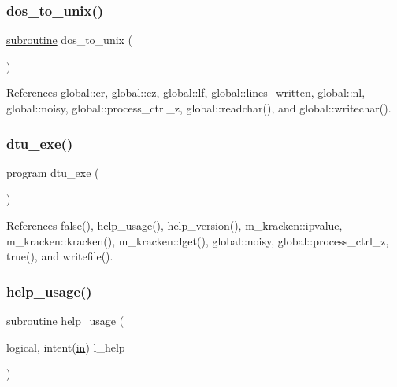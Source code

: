 \subsubsection{\texorpdfstring{dos\+\_\+to\+\_\+unix()}{dos\_to\_unix()}}
{\footnotesize\ttfamily \hyperlink{M__stopwatch_83_8txt_acfbcff50169d691ff02d4a123ed70482}{subroutine} dos\+\_\+to\+\_\+unix (\begin{DoxyParamCaption}{ }\end{DoxyParamCaption})}



References global\+::cr, global\+::cz, global\+::lf, global\+::lines\+\_\+written, global\+::nl, global\+::noisy, global\+::process\+\_\+ctrl\+\_\+z, global\+::readchar(), and global\+::writechar().

\mbox{\label{dtu_8f90_abff0f15f5d5e680978944e8d3530395a}} 
\subsubsection{\texorpdfstring{dtu\+\_\+exe()}{dtu\_exe()}}
{\footnotesize\ttfamily program dtu\+\_\+exe (\begin{DoxyParamCaption}{ }\end{DoxyParamCaption})}



References false(), help\+\_\+usage(), help\+\_\+version(), m\+\_\+kracken\+::ipvalue, m\+\_\+kracken\+::kracken(), m\+\_\+kracken\+::lget(), global\+::noisy, global\+::process\+\_\+ctrl\+\_\+z, true(), and writefile().

\mbox{\label{dtu_8f90_a3e09a3b52ee8fb04eeb93fe5761626a8}} 
\subsubsection{\texorpdfstring{help\+\_\+usage()}{help\_usage()}}
{\footnotesize\ttfamily \hyperlink{M__stopwatch_83_8txt_acfbcff50169d691ff02d4a123ed70482}{subroutine} help\+\_\+usage (\begin{DoxyParamCaption}\item[{logical, intent(\hyperlink{M__journal_83_8txt_afce72651d1eed785a2132bee863b2f38}{in})}]{l\+\_\+help }\end{DoxyParamCaption})}



